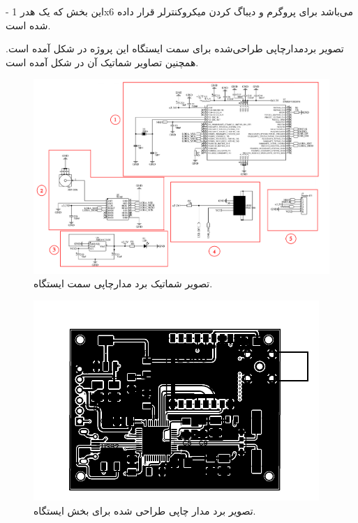 - این بخش که یک هدر 1x6 می‌باشد برای پروگرم و دیباگ کردن میکروکنترلر قرار داده شده است.

تصویر بردمدارچاپی طراحی‌شده برای سمت ایستگاه این پروژه در شکل  آمده است. همچنین تصاویر شماتیک آن در شکل  آمده است.
\begin{figure}[H]
	\includegraphics[width=\linewidth]{Assets/Schematic_Reciver.png}
	\caption{تصویر شماتیک برد مدارچاپی سمت ایستگاه.}
	\label{fig:SchematicReciver}
\end{figure}

\begin{figure}[H]
	\centering
	\includegraphics[width=0.7\linewidth]{Assets/PCB_Reciver.pdf}
	\caption{تصویر برد مدار چاپی طراحی شده برای بخش ایستگاه.}
	\label{fig:PCBReciver}
\end{figure}



